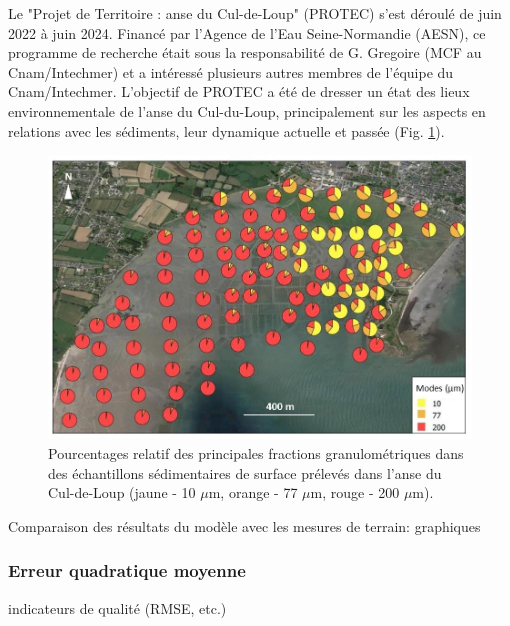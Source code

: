\documentclass[10pt,a4paper,titlepage]{article}
\begin{document}
    Le "Projet de Territoire : anse du Cul-de-Loup" (PROTEC) s'est déroulé de juin 2022 à juin 2024. Financé par l'Agence de l'Eau Seine-Normandie (AESN), ce programme de recherche était sous la responsabilité de G. Gregoire (MCF au Cnam/Intechmer) et a intéressé plusieurs autres membres de l'équipe du Cnam/Intechmer. L'objectif de PROTEC a été de dresser un état des lieux environnementale de l'anse du Cul-du-Loup, principalement sur les aspects en relations avec les sédiments, leur dynamique actuelle et passée (Fig. \ref{fig:sed-adcl}).
    
    \begin{figure}[!h]
        \centering
        \includegraphics[width=0.8\linewidth]{../images/sed_adcl_protec.png}
        \caption[Sédiment de l'anse du Cul-de-Loup]{Pourcentages relatif des principales fractions granulométriques dans des échantillons sédimentaires de surface prélevés dans l'anse du Cul-de-Loup (jaune - 10 $\mu$m, orange - 77 $\mu$m, rouge - 200 $\mu$m).}
        \label{fig:sed-adcl}
    \end{figure}
    
    
    
    
    Comparaison des résultats du modèle avec les mesures de terrain: graphiques
    
    \subsubsection{Erreur quadratique moyenne}
    indicateurs de qualité (RMSE, etc.)
    
\end{document}
